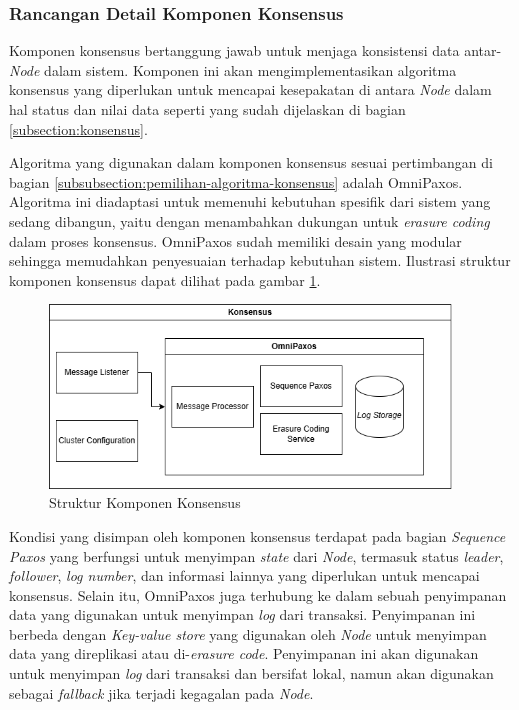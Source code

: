 \subsubsection{Rancangan Detail Komponen Konsensus}
\label{subsubsection:detail-komponen-konsensus}

Komponen konsensus bertanggung jawab untuk menjaga konsistensi data antar-\textit{Node} dalam sistem. Komponen ini akan mengimplementasikan algoritma konsensus yang diperlukan untuk mencapai kesepakatan di antara \textit{Node} dalam hal status dan nilai data seperti yang sudah dijelaskan di bagian \ref{subsection:konsensus}.

Algoritma yang digunakan dalam komponen konsensus sesuai pertimbangan di bagian \ref{subsubsection:pemilihan-algoritma-konsensus} adalah OmniPaxos. Algoritma ini diadaptasi untuk memenuhi kebutuhan spesifik dari sistem yang sedang dibangun, yaitu dengan menambahkan dukungan untuk \textit{erasure coding} dalam proses konsensus. OmniPaxos sudah memiliki desain yang modular sehingga memudahkan penyesuaian terhadap kebutuhan sistem. Ilustrasi struktur komponen konsensus dapat dilihat pada gambar \ref{fig:consensus-component-structure}.

\begin{figure}[ht]
    \centering
    \includegraphics[width=0.95\textwidth]{resources/chapter-3/consensus-architecture.png}
    \caption{Struktur Komponen Konsensus}
    \label{fig:consensus-component-structure}
\end{figure}

Kondisi yang disimpan oleh komponen konsensus terdapat pada bagian \textit{Sequence Paxos} yang berfungsi untuk menyimpan \textit{state} dari \textit{Node}, termasuk status \textit{leader}, \textit{follower}, \textit{log number}, dan informasi lainnya yang diperlukan untuk mencapai konsensus. Selain itu, OmniPaxos juga terhubung ke dalam sebuah penyimpanan data yang digunakan untuk menyimpan \textit{log} dari transaksi. Penyimpanan ini berbeda dengan \textit{Key-value store} yang digunakan oleh \textit{Node} untuk menyimpan data yang direplikasi atau di-\textit{erasure code}. Penyimpanan ini akan digunakan untuk menyimpan \textit{log} dari transaksi dan bersifat lokal, namun akan digunakan sebagai \textit{fallback} jika terjadi kegagalan pada \textit{Node}.

